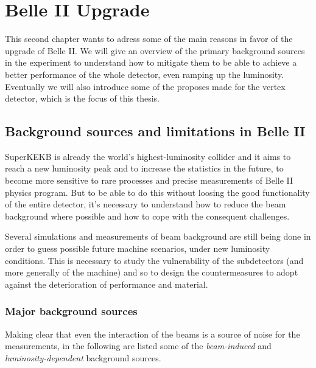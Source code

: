 \chapter{Belle II Upgrade}

This second chapter wants to adress some of the main reasons in favor of the upgrade of Belle II. We will give an overview of the primary background sources in the experiment to understand how to mitigate them to be able to achieve a better performance of the whole detector, even ramping up the luminosity. Eventually we will also introduce some of the proposes made for the vertex detector, which is the focus of this thesis.


\section{Background sources and limitations in Belle II}

SuperKEKB is already the world's highest-luminosity collider and it aims to reach a new luminosity peak and to increase the statistics in the future, to become more sensitive to rare processes and precise measurements of Belle II physics program. 
But to be able to do this without loosing the good functionality of the entire detector, it's necessary to understand how to reduce the beam background where possible and how to cope with the consequent challenges.

Several simulations and measurements of beam background are still being done in order to guess possible future machine scenarios, under new luminosity conditions.
This is necessary to study the vulnerability of the subdetectors (and more generally of the machine) and so to design the countermeasures to adopt against the deterioration of performance and material.


\subsection{Major background sources}

Making clear that even the interaction of the beams is a source of noise for the measurements, in the following are listed some of the \textit{beam-induced} and \textit{luminosity-dependent} background sources.


